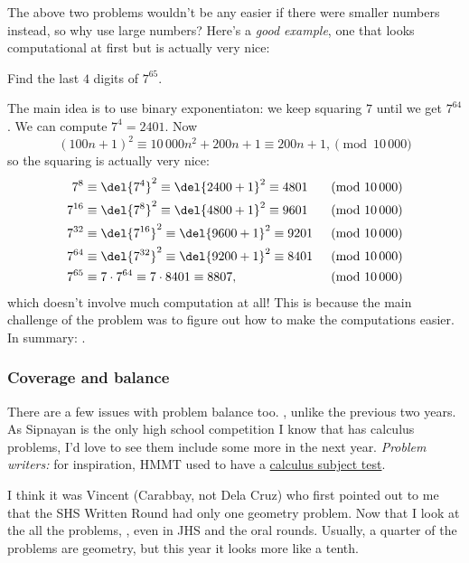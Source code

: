 \documentclass[11pt,paper=letter]{scrartcl}
\begin{document}
The above two problems wouldn't be any easier if there were smaller numbers instead, so why use large numbers? Here's a \emph{good example}, one that looks computational at first but is actually very nice:

\begin{probboxed}
   Find the last $4$ digits of $7^{65}$.
\end{probboxed}

The main idea is to use binary exponentiaton: we keep squaring $7$ until we get $7^{64}$. We can compute $7^4 = 2401$. Now
$$(100n + 1)^2 \equiv 10\,000n^2 + 200n + 1 \equiv 200n + 1, \pmod{10\,000}$$
so the squaring is actually very nice:
\begin{align*}
  7^8 &\equiv \del{7^4}^2 \equiv \del{2400 + 1}^2 \equiv 4801 & \pmod{10\,000} \\
  7^{16} &\equiv \del{7^8}^2 \equiv \del{4800 + 1}^2 \equiv 9601 & \pmod{10\,000} \\
  7^{32} &\equiv \del{7^{16}}^2 \equiv \del{9600 + 1}^2 \equiv 9201 & \pmod{10\,000} \\
  7^{64} &\equiv \del{7^{32}}^2 \equiv \del{9200 + 1}^2 \equiv 8401 & \pmod{10\,000} \\
  7^{65} &\equiv 7 \cdot 7^{64} \equiv 7 \cdot 8401 \equiv 8807, & \pmod{10\,000}
\end{align*}
which doesn't involve much computation at all! This is because the main challenge of the problem was to figure out how to make the computations easier. In summary: .

\subsubsection*{Coverage and balance}

There are a few issues with problem balance too. , unlike the previous two years. As Sipnayan is the only high school competition I know that has calculus problems, I'd love to see them include some more in the next year. \emph{Problem writers:} for inspiration, HMMT used to have a \href{https://www.hmmt.co/static/archive/february/problems/2010/pcalc10f.pdf}{calculus subject test}.

I think it was Vincent (Carabbay, not Dela Cruz) who first pointed out to me that the SHS Written Round had only one geometry problem. Now that I look at the all the problems, , even in JHS and the oral rounds. Usually, a quarter of the problems are geometry, but this year it looks more like a tenth.
\end{document}

